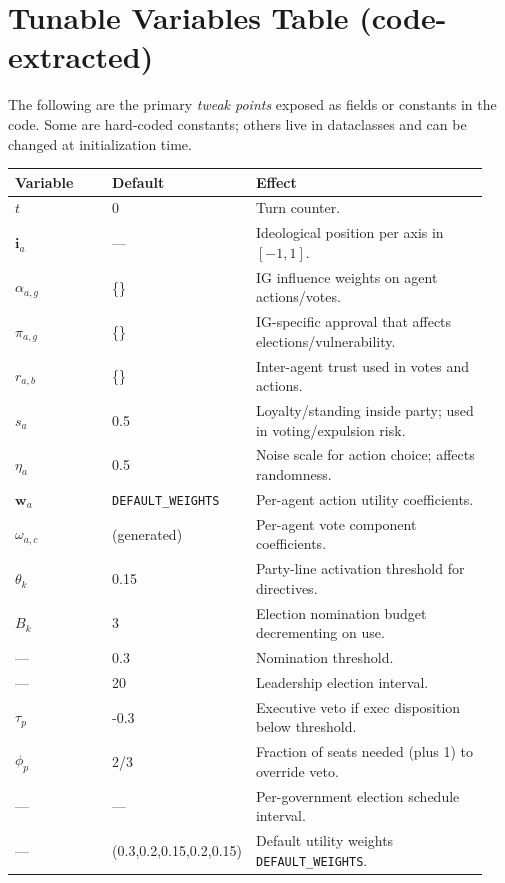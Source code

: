 \documentclass[11pt]{article}
\begin{document}
\section{Tunable Variables Table (code-extracted)}
The following are the primary \emph{tweak points} exposed as fields or constants in the code.
Some are hard-coded constants; others live in dataclasses and can be changed at initialization time.

\begin{longtable}{@{}p{0.22\linewidth}p{0.18\linewidth}p{0.54\linewidth}@{}}
\toprule
\textbf{Variable} & \textbf{Default} & \textbf{Effect} \\
\midrule
\endhead

$t$ & 0 & Turn counter. \\
$\mathbf{i}_a$ & --- & Ideological position per axis in $[-1,1]$. \\
$\alpha_{a,g}$ & \{\} & IG influence weights on agent actions/votes. \\
$\pi_{a,g}$ & \{\} & IG-specific approval that affects elections/vulnerability. \\
$r_{a,b}$ & \{\} & Inter-agent trust used in votes and actions. \\
$s_a$ & 0.5 & Loyalty/standing inside party; used in voting/expulsion risk. \\
$\eta_a$ & 0.5 & Noise scale for action choice; affects randomness. \\
$\mathbf{w}_a$ & \texttt{DEFAULT\_WEIGHTS} & Per-agent action utility coefficients. \\
$\omega_{a,c}$ & (generated) & Per-agent vote component coefficients. \\

$\theta_k$ & 0.15 & Party-line activation threshold for directives. \\
$B_k$ & 3 & Election nomination budget decrementing on use. \\
--- & 0.3 & Nomination threshold. \\
--- & 20 & Leadership election interval. \\

$\tau_p$ & -0.3 & Executive veto if exec disposition below threshold. \\
$\phi_p$ & 2/3 & Fraction of seats needed (plus 1) to override veto. \\
--- & --- & Per-government election schedule interval. \\

--- & (0.3,0.2,0.15,0.2,0.15) & Default utility weights \texttt{DEFAULT\_WEIGHTS}. \\


\end{longtable}
\end{document}
